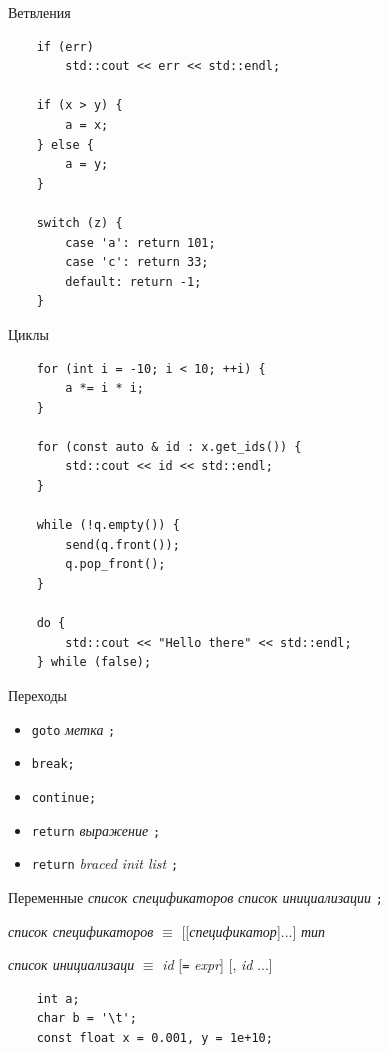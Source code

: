 \documentclass[unknownkeysallowed,xcolor=table]{beamer}
\begin{document}
\begin{frame}[fragile]{Ветвления}
  \begin{lstlisting}
    if (err)
        std::cout << err << std::endl;

    if (x > y) {
        a = x;
    } else {
        a = y;
    }

    switch (z) {
        case 'a': return 101;
        case 'c': return 33;
        default: return -1;
    }
  \end{lstlisting}
\end{frame}

\begin{frame}[fragile]{Циклы}
  \begin{lstlisting}
    for (int i = -10; i < 10; ++i) {
        a *= i * i;
    }

    for (const auto & id : x.get_ids()) {
        std::cout << id << std::endl;
    }

    while (!q.empty()) {
        send(q.front());
        q.pop_front();
    }

    do {
        std::cout << "Hello there" << std::endl;
    } while (false);
  \end{lstlisting}
\end{frame}

\begin{frame}[fragile]{Переходы}
  \begin{itemize}
    \item \lstinline{goto} \emph{метка} \lstinline{;} \vspace{1em}
    \item \lstinline{break;} \vspace{1em}
    \item \lstinline{continue;} \vspace{1em}
    \item \lstinline{return} \emph{выражение} \lstinline{;} \vspace{1em}
    \item \lstinline{return} \emph{braced init list} \lstinline{;}
  \end{itemize}
\end{frame}

\begin{frame}[fragile]{Переменные}
  \emph{список спецификаторов} \emph{список инициализации} \lstinline{;}

  \vspace{1em}

  \emph{список спецификаторов} $\equiv$ [[\emph{спецификатор}]...] \emph{тип}

  \vspace{1em}

  \emph{список инициализаци} $\equiv$ \emph{id} [\lstinline{=} \emph{expr}] [, \emph{id} ...]

  \vspace{1em}

  \begin{lstlisting}
    int a;
    char b = '\t';
    const float x = 0.001, y = 1e+10;
  \end{lstlisting}
\end{frame}
\end{document}
